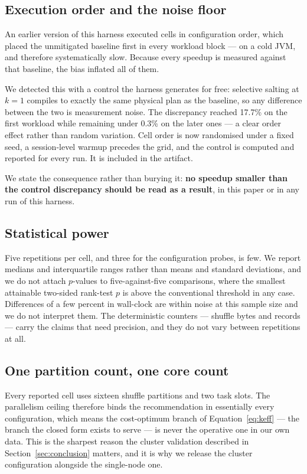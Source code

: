 \subsection{Execution order and the noise floor}

An earlier version of this harness executed cells in configuration order, which
placed the unmitigated baseline first in every workload block --- on a cold
JVM, and therefore systematically slow. Because every speedup is measured
against that baseline, the bias inflated all of them.

We detected this with a control the harness generates for free: selective
salting at $k=1$ compiles to exactly the same physical plan as the baseline, so
any difference between the two is measurement noise. The discrepancy reached
17.7\% on the first workload while remaining under 0.3\% on the later ones ---
a clear order effect rather than random variation. Cell order is now
randomised under a fixed seed, a session-level warmup precedes the grid, and
the control is computed and reported for every run. It is included in the
artifact.

We state the consequence rather than burying it: \textbf{no speedup smaller
than the control discrepancy should be read as a result}, in this paper or in
any run of this harness.

\subsection{Statistical power}

Five repetitions per cell, and three for the configuration probes, is few. We
report medians and interquartile ranges rather than means and standard
deviations, and we do not attach $p$-values to five-against-five comparisons,
where the smallest attainable two-sided rank-test $p$ is above the conventional
threshold in any case. Differences of a few percent in wall-clock are within
noise at this sample size and we do not interpret them. The deterministic
counters --- shuffle bytes and records --- carry the claims that need
precision, and they do not vary between repetitions at all.

\subsection{One partition count, one core count}

Every reported cell uses sixteen shuffle partitions and two task slots. The
parallelism ceiling therefore binds the recommendation in essentially every
configuration, which means the cost-optimum branch of
Equation~\eqref{eq:keff} --- the branch the closed form exists to serve --- is
never the operative one in our own data. This is the sharpest reason the
cluster validation described in Section~\ref{sec:conclusion} matters, and it
is why we release the cluster configuration alongside the single-node one.

